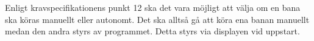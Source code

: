 Enligt kravspecifikationens punkt 12 ska det vara möjligt att välja om en bana
ska köras manuellt eller autonomt. Det ska alltså gå att köra ena banan
manuellt medan den andra styrs av programmet. Detta styrs via displayen vid
uppstart.

